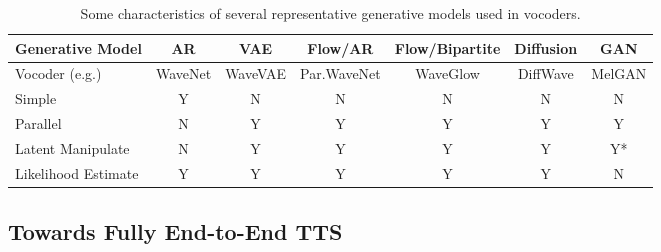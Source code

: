 \documentclass{article}
\begin{document}



\begin{table}[h!]
\small
	\caption{Some characteristics of several representative generative models used in vocoders.}
	\centering
	\begin{tabular}{l | c| c |c c | c| c }
	\toprule
		Generative Model & AR & VAE & Flow/AR & Flow/Bipartite & Diffusion & GAN \\
		\midrule
		Vocoder (e.g.)  & WaveNet & WaveVAE & Par.WaveNet & WaveGlow & DiffWave & MelGAN \\
		\midrule
		 Simple  & Y       & N         & N    &N    &  N        & N \\
		 Parallel& N       & Y         & Y    &Y    &  Y        & Y \\
		 Latent Manipulate & N & Y   & Y   & Y    &  Y        & Y* \\
		 Likelihood Estimate & Y&Y   & Y   & Y    &  Y        & N \\
        \bottomrule
	\end{tabular}
	\vspace{0.3cm}
	\label{tab_generative_summary}
\end{table}




\subsection{Towards Fully End-to-End TTS}
\label{sec_funda_e2e}
\end{document}
